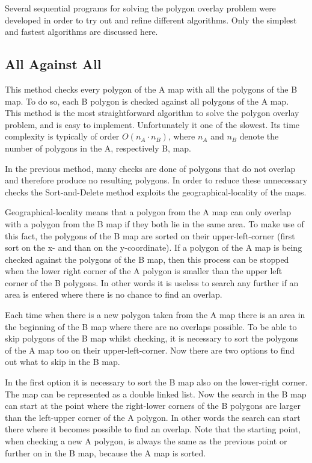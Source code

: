 
Several sequential programs for solving the polygon overlay problem
were developed in order to try out and refine different algorithms.
Only the simplest and fastest algorithms are discussed here.


\subsection{All Against All}

This method checks every polygon of the A map with all the polygons
of the B map.
To do so, each B polygon is checked against all polygons of the A map.
This method is the most straightforward algorithm to solve
the polygon overlay problem, and is easy to implement.
Unfortunately it one of the slowest.
Its time complexity is typically of order $O ( n_A \cdot n_B )$, where
$n_A$ and $n_B$ denote the number of polygons in the A, respectively B,
map.



In the previous method, many checks are done of
polygons that do not overlap and therefore produce no resulting
polygons.
In order to reduce these unnecessary checks the Sort-and-Delete
method exploits the geographical-locality of the maps.

Geographical-locality means that a polygon from the A map
can only overlap with a polygon from the B map if they both
lie in the same area.
To make use of this fact, the polygons of the B map are
sorted on their upper-left-corner (first sort on the x- and
than on the y-coordinate).
If a polygon of the A map is being checked against the
polygons of the B map, then this process can be stopped when
the lower right corner of the A polygon is smaller than the
upper left corner of the B polygons.
In other words it is useless to search any further if an area
is entered where there is no chance to find an overlap.

Each time when there is a new polygon taken from the A map
there is an area in the beginning of the B map where there
are no overlaps possible.
To be able to skip polygons of the B map whilst checking, it is
necessary to sort the polygons of the A map too on their 
upper-left-corner.
Now there are two options to find out what to skip in the
B map.

In the first option it is necessary to sort the B map also
on the lower-right corner.
The map can be represented as a double linked list.
Now the search in the B map can start at the point where the
right-lower corners of the B polygons are larger than the
left-upper corner of the A polygon.
In other words the search can start there where it becomes
possible to find an overlap.
Note that the starting point, when checking a new A polygon,
is always the same as the previous point or further on in
the B map, because the A map is sorted.

